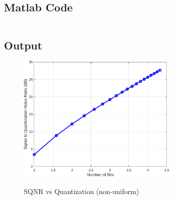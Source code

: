 \subsection{Matlab Code}

\inputminted[fontsize=\footnotesize,autogobble]{matlab}{code/sqnr2.m}
\subsection{Output}

\begin{figure}[!htb]
	\centering
	\includegraphics[width=0.7\textwidth]{res/figures/Figure_4.pdf}
	\label{output:SQNR vs quantization 2}
	\caption{SQNR vs Quantization (non-uniform)}
\end{figure}